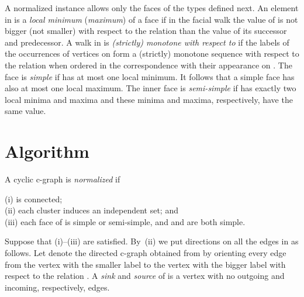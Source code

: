 \documentclass{llncs}
\begin{document}
A normalized instance allows only the faces of the types defined next.
An element  in  is a \emph{local minimum} (\emph{maximum}) of a face  if in the  facial walk   the value of  is not bigger (not smaller)
with respect to the  relation   than the value of its successor and predecessor.
A walk  in  is \emph{(strictly) monotone with respect to } if the labels of the occurrences of vertices on  form a (strictly) monotone sequence
with respect to the  relation  when ordered
in the correspondence with their appearance on  .
The  face  is \emph{simple} if  has at most one local minimum. It follows 
that a simple face  has also at most one local maximum.
The inner face    is \emph{semi-simple}  if  has exactly two local minima and maxima and these minima and maxima, respectively,  have the same  value.



\section{Algorithm}
 \label{sec:alg}

A cyclic c-graph  is \emph{normalized } if 

\noindent
(i)  is connected; \\
(ii) each cluster  induces an independent set; and \\
(iii) each face of  is simple or semi-simple, and  and  are both simple. 

Suppose that (i)--(iii) are satisfied. 
By~(ii) we  put directions on all the edges in  as follows.
Let  denote the directed c-graph obtained from  by orienting every edge
 from the vertex with the smaller label  to the vertex with the bigger label  with respect to the relation .
A \emph{sink} and \emph{source} of  is
a vertex with no outgoing and incoming, respectively, edges.
\end{document}
